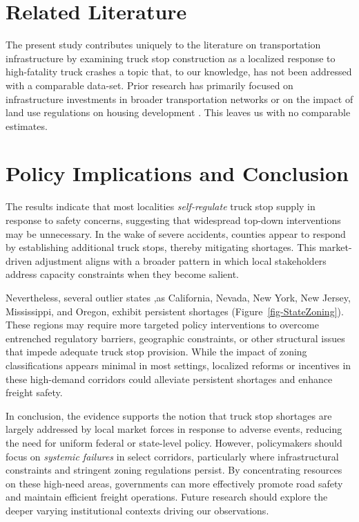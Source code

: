 \documentclass[
  8pt,
  12pt]{article}
\begin{document}
\section{Related Literature}\label{related-literature}

The present study contributes uniquely to the literature on
transportation infrastructure by examining truck stop construction as a
localized response to high-fatality truck crashes a topic that, to our
knowledge, has not been addressed with a comparable data-set. Prior
research has primarily focused on infrastructure investments in broader
transportation networks or on the impact of land use regulations on
housing development \citet{mclaughlinLandUseRegulation2012} . This
leaves us with no comparable estimates.

\section{\texorpdfstring{\textbf{Policy Implications and
Conclusion}}{Policy Implications and Conclusion}}\label{policy-implications-and-conclusion}

The results indicate that most localities \emph{self-regulate} truck
stop supply in response to safety concerns, suggesting that widespread
top-down interventions may be unnecessary. In the wake of severe
accidents, counties appear to respond by establishing additional truck
stops, thereby mitigating shortages. This market-driven adjustment
aligns with a broader pattern in which local stakeholders address
capacity constraints when they become salient.

Nevertheless, several outlier states ,as California, Nevada, New York,
New Jersey, Mississippi, and Oregon, exhibit persistent shortages
(Figure~\ref{fig-StateZoning}). These regions may require more targeted
policy interventions to overcome entrenched regulatory barriers,
geographic constraints, or other structural issues that impede adequate
truck stop provision. While the impact of zoning classifications appears
minimal in most settings, localized reforms or incentives in these
high-demand corridors could alleviate persistent shortages and enhance
freight safety.

In conclusion, the evidence supports the notion that truck stop
shortages are largely addressed by local market forces in response to
adverse events, reducing the need for uniform federal or state-level
policy. However, policymakers should focus on \emph{systemic failures}
in select corridors, particularly where infrastructural constraints and
stringent zoning regulations persist. By concentrating resources on
these high-need areas, governments can more effectively promote road
safety and maintain efficient freight operations. Future research should
explore the deeper varying institutional contexts driving our
observations.


  
\end{document}
